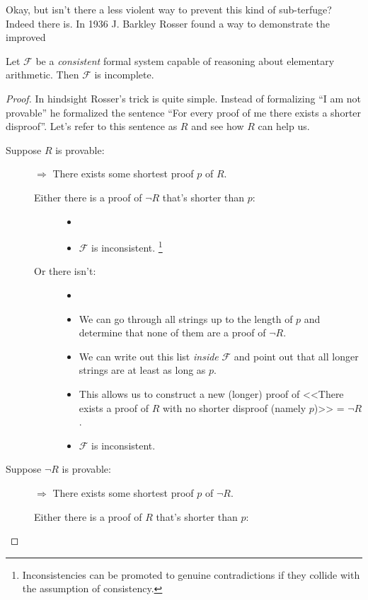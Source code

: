 \documentclass{article}
\theoremstyle{customstyle}
\newcommand{\F}{\ensuremath{\mathcal{F}}}
\begin{document}
Okay, but isn't there a less violent way to prevent this kind of sub-terfuge? Indeed there is. In 1936 J. Barkley Rosser found a way to demonstrate the improved

\begin{theorem}
Let $\F$ be a \textit{consistent} formal system capable of reasoning about elementary arithmetic. Then $\F$ is incomplete.
\end{theorem}

\begin{proof}
In hindsight Rosser's trick is quite simple. Instead of formalizing ``I am not provable'' he formalized the sentence ``For every proof of me there exists a shorter disproof''. Let's refer to this sentence as $R$ and see how $R$ can help us.
\begin{description}
\item[Suppose $R$ is provable:]
$\Rightarrow$ There exists some shortest proof $p$ of $R$.
\begin{description}
\item[Either there is a proof of $\neg R$ that's shorter than $p$:]
\begin{itemize}
\item[]
\item $\F$ is inconsistent. \lightning\footnote{Inconsistencies can be promoted to genuine contradictions if they collide with the assumption of consistency.}
\end{itemize}
\item[Or there isn't:]
\begin{itemize}
\item[]
\item We can go through all strings up to the length of $p$ and determine that none of them are a proof of $\neg R$.
\item We can write out this list \textit{inside} $\F$ and point out that all longer strings are at least as long as $p$.
\item This allows us to construct a new (longer) proof of <<There exists a proof of $R$ with no shorter disproof (namely $p$)>> = $\neg R$.
\item $\F$ is inconsistent. \lightning
\end{itemize}
\end{description}
\item[Suppose $\neg R$ is provable:]
$\Rightarrow$ There exists some shortest proof $p$ of $\neg R$.
\begin{description}
\item[Either there is a proof of $R$ that's shorter than $p$:]

\end{description}
\end{description}
\end{proof}
\end{document}
